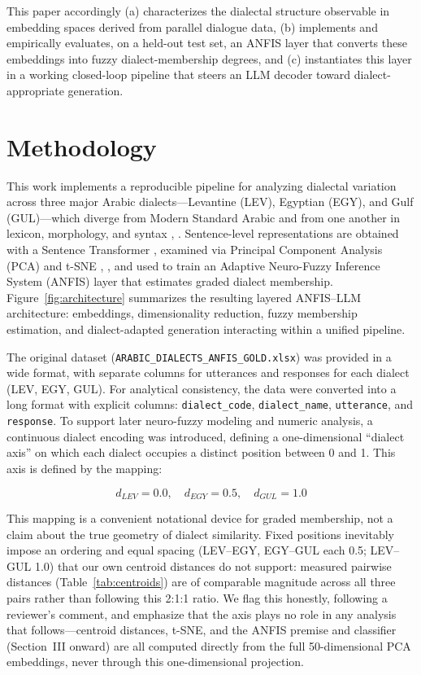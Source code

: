 \documentclass[conference]{IEEEtran}
\begin{document}
This paper accordingly (a) characterizes the dialectal structure observable in embedding spaces derived from parallel dialogue data, (b) implements and empirically evaluates, on a held-out test set, an ANFIS layer that converts these embeddings into fuzzy dialect-membership degrees, and (c) instantiates this layer in a working closed-loop pipeline that steers an LLM decoder toward dialect-appropriate generation.

\section{Methodology}
This work implements a reproducible pipeline for analyzing dialectal variation across three major Arabic dialects---Levantine (LEV), Egyptian (EGY), and Gulf (GUL)---which diverge from Modern Standard Arabic and from one another in lexicon, morphology, and syntax \cite{habash2012}, \cite{elhaj2021}. Sentence-level representations are obtained with a Sentence Transformer \cite{reimers2019}, examined via Principal Component Analysis (PCA) and t-SNE \cite{jolliffe2002}, \cite{vandermaaten2008}, and used to train an Adaptive Neuro-Fuzzy Inference System (ANFIS) layer \cite{jang1993} that estimates graded dialect membership. Figure~\ref{fig:architecture} summarizes the resulting layered ANFIS--LLM architecture: embeddings, dimensionality reduction, fuzzy membership estimation, and dialect-adapted generation interacting within a unified pipeline.

The original dataset (\texttt{ARABIC\_DIALECTS\_\allowbreak ANFIS\_GOLD.xlsx}) was provided in a wide format, with separate columns for utterances and responses for each dialect (LEV, EGY, GUL). For analytical consistency, the data were converted into a long format with explicit columns: \texttt{dialect\_code}, \texttt{dialect\_name}, \texttt{utterance}, and \texttt{response}. To support later neuro-fuzzy modeling and numeric analysis, a continuous dialect encoding was introduced, defining a one-dimensional ``dialect axis'' on which each dialect occupies a distinct position between 0 and 1. This axis is defined by the mapping:

\begin{equation}
d_{LEV} = 0.0, \quad d_{EGY} = 0.5, \quad d_{GUL} = 1.0
\label{eq:axis}
\end{equation}

This mapping is a convenient notational device for graded membership, not a claim about the true geometry of dialect similarity. Fixed positions inevitably impose an ordering and equal spacing (LEV--EGY, EGY--GUL each 0.5; LEV--GUL 1.0) that our own centroid distances do not support: measured pairwise distances (Table~\ref{tab:centroids}) are of comparable magnitude across all three pairs rather than following this 2:1:1 ratio. We flag this honestly, following a reviewer's comment, and emphasize that the axis plays no role in any analysis that follows---centroid distances, t-SNE, and the ANFIS premise and classifier (Section~III onward) are all computed directly from the full 50-dimensional PCA embeddings, never through this one-dimensional projection.
\end{document}
